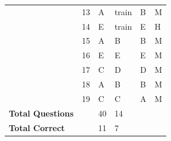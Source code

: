 \documentclass[pageno]{jpaper}
\begin{document}
\begin{table}[]
\begin{tabular}{llllll}
\textbf{}                & 13                                  & A                                          & train                                       & B                                           & M                                       \\
\textbf{}                & 14                                  & E                                          & train                                       & E                                           & H                                       \\
\textbf{}                & 15                                  & A                                          & B                                           & B                                           & M                                       \\
\textbf{}                & 16                                  & E                                          & E                                           & E                                           & M                                       \\
\textbf{}                & 17                                  & C                                          & D                                           & D                                           & M                                       \\
\textbf{}                & 18                                  & A                                          & B                                           & B                                           & M                                       \\
\textbf{}                & 19                                  & C                                          & C                                           & A                                           & M                                       \\
\textbf{Total Questions} &                                     & 40                                         & 14                                          &                                             &                                         \\
\textbf{Total Correct}   &                                     & 11                                         & 7                                           &                                             &                                         \\ \bottomrule
\end{tabular}
\end{table}
\end{document}
